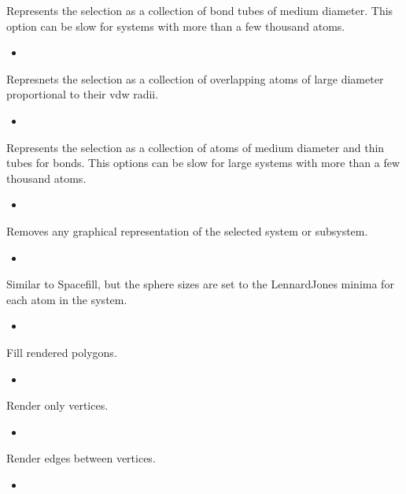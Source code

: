 \documentclass[letterpaper,11pt,english]{sphinxmanual}
\begin{document}
Represents the selection as a collection of bond tubes of medium diameter. This option can be slow for systems with more than a few thousand atoms.
\begin{itemize}
\item {} 

\end{itemize}

Represnets the selection as a collection of overlapping atoms of large diameter proportional to their vdw radii.
\begin{itemize}
\item {} 

\end{itemize}

Represents the selection as a collection of atoms of medium diameter and thin tubes for bonds. This options can be slow for large systems with more than a few thousand atoms.
\begin{itemize}
\item {} 

\end{itemize}

Removes any graphical representation of the selected system or subsystem.
\begin{itemize}
\item {} 

\end{itemize}

Similar to Spacefill, but the sphere sizes are set to the Lennard\sphinxhyphen{}Jones minima for each atom in the system.
\begin{itemize}
\item {} 

\end{itemize}

Fill rendered polygons.
\begin{itemize}
\item {} 

\end{itemize}

Render only vertices.
\begin{itemize}
\item {} 

\end{itemize}

Render edges between vertices.
\begin{itemize}
\item {} 

\end{itemize}
\end{document}
